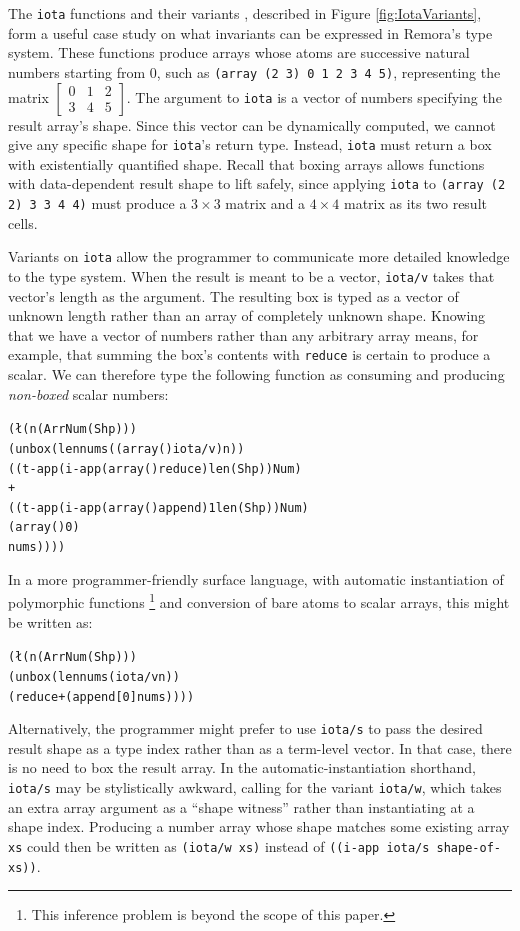 The {\tt iota} functions and their variants ,
described in Figure \ref{fig:IotaVariants},
form a useful case study on
what invariants can be expressed in Remora's type system.
These functions produce arrays whose atoms are
successive natural numbers starting from 0,
such as {\tt (array (2 3) 0 1 2 3 4 5)},
representing the matrix
$\left[\begin{smallmatrix}
    0 & 1 & 2 \\ 3 & 4 & 5
\end{smallmatrix}\right]$.
The argument to {\tt iota}
is a vector of numbers specifying the result array's shape.
Since this vector can be dynamically computed,
we cannot give any specific shape for {\tt iota}'s return type.
Instead, {\tt iota} must return a box
with existentially quantified shape.
Recall that boxing arrays allows functions with data-dependent result shape to lift safely,
since applying {\tt iota} to {\tt (array (2 2) 3 3 4 4)}
must produce a $3 \times 3$ matrix and a $4 \times 4$ matrix
as its two result cells.

Variants on {\tt iota}
allow the programmer to
communicate more detailed knowledge to the type system.
When the result is meant to be a vector,
{\tt iota/v} takes that vector's length as the argument.
The resulting box is typed as a vector of unknown length
rather than an array of completely unknown shape.
Knowing that we have a vector of numbers rather than any arbitrary array
means, for example,
that summing the box's contents with {\tt reduce}
is certain to produce a scalar.
We can therefore type the following function as
consuming and producing \emph{non-boxed} scalar numbers:
\begin{alltt}
(\l{(n (Arr Num (Shp)))}
  (unbox (len nums ((array () iota/v) n))
    ((t-app (i-app (array () reduce) len (Shp)) Num)
     +
     ((t-app (i-app (array () append) 1 len (Shp)) Num)
      (array () 0)
     nums))))
\end{alltt}
In a more programmer-friendly surface language,
with automatic instantiation of polymorphic functions%
\footnote{This inference problem is beyond the scope of this paper.}
and conversion of bare atoms to scalar arrays,
this might be written as:
\begin{alltt}
(\l{(n (Arr Num (Shp)))}
  (unbox (len nums (iota/v n))
    (reduce + (append [0] nums))))
\end{alltt}

Alternatively, the programmer might prefer to use {\tt iota/s}
to pass the desired result shape as a type index
rather than as a term-level vector.
In that case, there is no need to box the result array.
In the automatic-instantiation shorthand,
{\tt iota/s} may be stylistically awkward,
calling for the variant {\tt iota/w}, which
takes an extra array argument as a ``shape witness''
rather than instantiating at a shape index.
Producing a number array whose shape matches some existing array {\tt xs}
could then be written as {\tt (iota/w xs)}
instead of {\tt ((i-app iota/s shape-of-xs))}.

